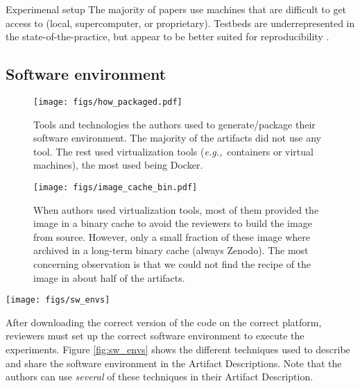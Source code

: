 \documentclass[sigconf,natbib=false]{acmart}
\newcommand{\eg}{\emph{e.g.,}}
\newcommand{\ad}{Artifact Description}
\newcommand{\aeval}{Artifact Evaluation}
\begin{document}
\begin{lesson}{Experimenal setup}{}
  The majority of papers use machines that are difficult to get access to (local, supercomputer, or proprietary). 
  Testbeds are underrepresented in the state-of-the-practice, but appear to be better suited for reproducibility \cite{nussbaum2017testbeds}.
\end{lesson}

\subsection{Software environment}\label{sec:sop:sw}

\begin{figure*}
  \centering
  \begin{subfigure}{0.49\textwidth}
    \centering
    \texttt{[image: figs/how\_packaged.pdf]}
    \caption{Tools and technologies the authors used to generate/package their software environment. The majority of the artifacts did not use any tool. The rest used virtualization tools (\eg\ containers or virtual machines), the most used being Docker.}\label{fig:techno}
  \end{subfigure}
  \hfill
  \begin{subfigure}{0.49\textwidth}
      \centering
      \texttt{[image: figs/image\_cache\_bin.pdf]}
    \caption{When authors used virtualization tools, most of them provided the image in a binary cache to avoid the reviewers to build the image from source. However, only a small fraction of these image where archived in a long-term binary cache (always Zenodo). The most concerning observation is that we could not find the recipe of the image in about half of the artifacts.}\label{fig:cache_bin}
  \end{subfigure}
  \caption{Tools and technologies used to generate and package the software environment for the \aeval\ (Figure \ref{fig:techno}), and state of the image and its recipe in the case of the use of virtual tools (Figure \ref{fig:cache_bin}).}\label{fig:techo_cache}
\end{figure*}

\begin{figure*}
  \centering
  \texttt{[image: figs/sw\_envs]}
  \caption{Techniques used to share the software environment in the \ad s. Note than an paper can use several of these techniques.}\label{fig:sw_envs}
\end{figure*}

After downloading the correct version of the code on the correct platform, reviewers must set up the correct software environment to execute the experiments.
Figure \ref{fig:sw_envs} shows the different techniques used to describe and share the software environment in the \ad s.
Note that the authors can use \emph{several} of these techniques in their \ad.
\end{document}
